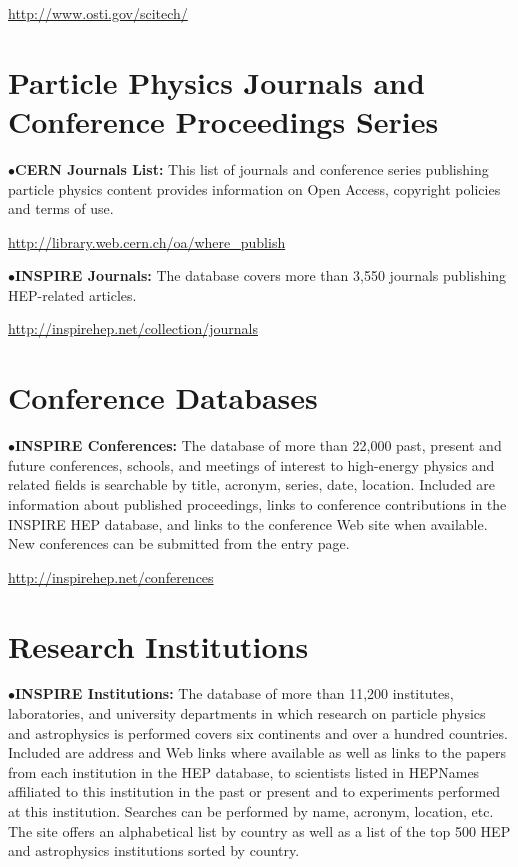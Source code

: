    \item{}\qquad\url{http://www.osti.gov/scitech/}
\medskip

\vglue -0.1in
\section{Particle Physics Journals and Conference Proceedings Series}%

\item{$\bullet$}{\bf CERN Journals List:} 
This list of journals and conference series publishing particle physics content provides information on Open Access, copyright policies and terms of use.

   \item{}\qquad\url{http://library.web.cern.ch/oa/where\_publish} 
\medskip

\item{$\bullet$}{\bf INSPIRE Journals:} 
The database covers more than 3,550 journals publishing HEP-related articles.

   \item{}\qquad\url{http://inspirehep.net/collection/journals}
\medskip


\section{Conference Databases}%

\item{$\bullet$}{\bf INSPIRE Conferences:} 
The database of more than 22,000 past, present and future conferences, schools, and meetings of interest to high-energy physics and related fields is searchable by title, acronym, series, date, location. Included are information about published proceedings, links to conference contributions in the INSPIRE HEP database, and links to the conference Web site when available. New conferences can be submitted from the entry page.
	\item{}\qquad\url{http://inspirehep.net/conferences}


\section{Research Institutions}%

\item{$\bullet$}{\bf INSPIRE Institutions:} 
The database of more than 11,200 institutes, laboratories, and university departments in which research on particle physics and astrophysics is performed covers six continents and over a hundred countries. Included are address and Web links where available as well as links to the papers from each institution in the HEP database, to scientists listed in HEPNames affiliated to this institution in the past or present and to experiments performed at this institution. Searches can be performed by name, acronym, location, etc. The site offers an alphabetical list by country as well as a list of the top 500 HEP and astrophysics institutions sorted by country.


